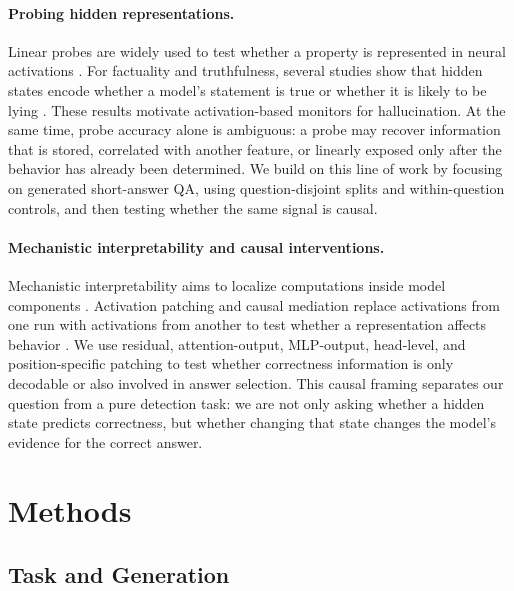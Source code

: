 \documentclass[11pt]{article}
\begin{document}
\paragraph{Probing hidden representations.}
Linear probes are widely used to test whether a property is represented in neural
activations \citep{Alain2017UnderstandingRepresentations,Hewitt2019DesigningProbes}.
For factuality and truthfulness, several studies show that hidden states encode
whether a model's statement is true or whether it is likely to be lying
\citep{Azaria2023TheLying,Burns2024DiscoveringSupervision,Marks2024TheDatasets}.
These results motivate activation-based monitors for hallucination. At the same
time, probe accuracy alone is ambiguous: a probe may recover information that is
stored, correlated with another feature, or linearly exposed only after the
behavior has already been determined. We build on this line of work by focusing on
generated short-answer QA, using question-disjoint splits and within-question
controls, and then testing whether the same signal is causal.

\paragraph{Mechanistic interpretability and causal interventions.}
Mechanistic interpretability aims to localize computations inside model components
\citep{Olah2020ZoomIn,Elhage2021MathematicalFramework,Wang2023InterpretabilityWild}.
Activation patching and causal mediation replace activations from one run with
activations from another to test whether a representation affects behavior
\citep{Vig2020CausalMediation,Geiger2021CausalAbstractions}. We use residual,
attention-output, MLP-output, head-level, and position-specific patching to test
whether correctness information is only decodable or also involved in answer
selection. This causal framing separates our question from a pure detection task:
we are not only asking whether a hidden state predicts correctness, but whether
changing that state changes the model's evidence for the correct answer.

\section{Methods}

\subsection{Task and Generation}
\end{document}
